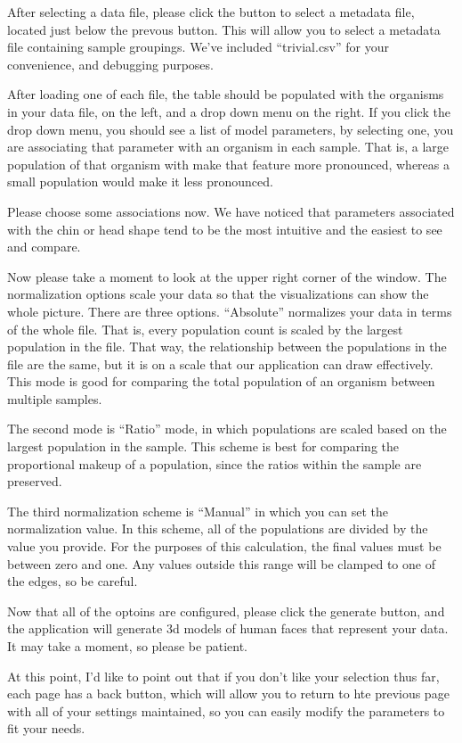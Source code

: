 \documentclass[letterpaper,10pt, onecolumn, draftclsnofoot]{IEEEtran}
\begin{document}
After selecting a data file, please click the button to select a metadata file, located just below the prevous button. This will allow you to select a metadata file containing sample groupings. We've included ``trivial.csv'' for your convenience, and debugging purposes.

After loading one of each file, the table should be populated with the organisms in your data file, on the left, and a drop down menu on the right. If you click the drop down menu, you should see a list of model parameters, by selecting one, you are associating that parameter with an organism in each sample. That is, a large population of that organism with make that feature more pronounced, whereas a small population would make it less pronounced. 

Please choose some associations now. We have noticed that parameters associated with the chin or head shape tend to be the most intuitive and the easiest to see and compare.

Now please take a moment to look at the upper right corner of the window. The normalization options scale your data so that the visualizations can show the whole picture. There are three options. ``Absolute'' normalizes your data in terms of the whole file. That is, every population count is scaled by the largest population in the file. That way, the relationship between the populations in the file are the same, but it is on a scale that our application can draw effectively. This mode is good for comparing the total population of an organism between multiple samples.

The second mode is ``Ratio'' mode, in which populations are scaled based on the largest population in the sample. This scheme is best for comparing the proportional makeup of a population, since the ratios within the sample are preserved.

The third normalization scheme is ``Manual'' in which you can set the normalization value. In this scheme, all of the populations are divided by the value you provide. For the purposes of this calculation, the final values must be between zero and one. Any values outside this range will be clamped to one of the edges, so be careful.

Now that all of the optoins are configured, please click the generate button, and the application will generate 3d models of human faces that represent your data. It may take a moment, so please be patient.

At this point, I'd like to point out that if you don't like your selection thus far, each page has a back button, which will allow you to return to hte previous page with all of your settings maintained, so you can easily modify the parameters to fit your needs.
\end{document}
